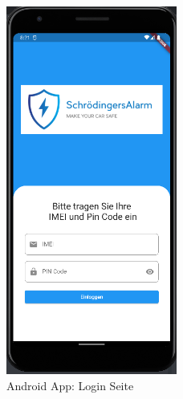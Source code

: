  \begin{figure}[H]
            \centering
            \includegraphics[width=0.5\textwidth]{Bilder/LoginIn.PNG}
            \caption{Android App: Login Seite}
    \end{figure}

